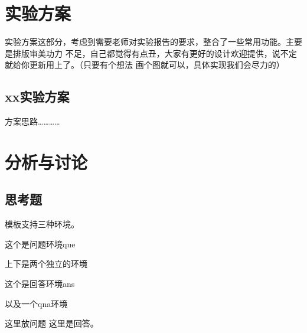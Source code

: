\documentclass{spaexp}
\begin{document}
\section{实验方案}
    实验方案这部分，考虑到需要老师对实验报告的要求，整合了一些常用功能。主要是排版审美功力
    不足，自己都觉得有点丑，大家有更好的设计欢迎提供，说不定就给你更新用上了。（只要有个想法
    画个图就可以，具体实现我们会尽力的）

    \subsection{xx实验方案}
        方案思路…………

        \recordhead
        \begin{step}
            \movehead
        \end{step}

\section{分析与讨论}
    \subsection{思考题}
        模板支持三种环境。
        \begin{que}
            这个是问题环境que
        \end{que}
        \vspace{2cm}
        上下是两个独立的环境
        \vspace{2cm}
        \begin{ans}
            这个是回答环境ans
        \end{ans}

        以及一个qna环境
        \begin{qna}{这里放问题}
            这里是回答。
        \end{qna}
\end{document}
